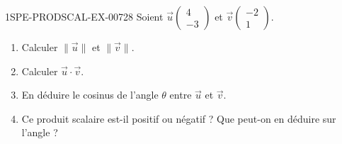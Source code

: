 \begin{exercice}{1SPE-PRODSCAL-EX-007}{2}{8}
Soient $\vec{u}\begin{pmatrix} 4 \\ -3 \end{pmatrix}$ et $\vec{v}\begin{pmatrix} -2 \\ 1 \end{pmatrix}$.
\begin{enumerate}
  \item Calculer $\|\vec{u}\|$ et $\|\vec{v}\|$.
  \item Calculer $\vec{u} \cdot \vec{v}$.
  \item En déduire le cosinus de l'angle $\theta$ entre $\vec{u}$ et $\vec{v}$.
  \item Ce produit scalaire est-il positif ou négatif ? Que peut-on en déduire sur l'angle ?
\end{enumerate}
\end{exercice}
